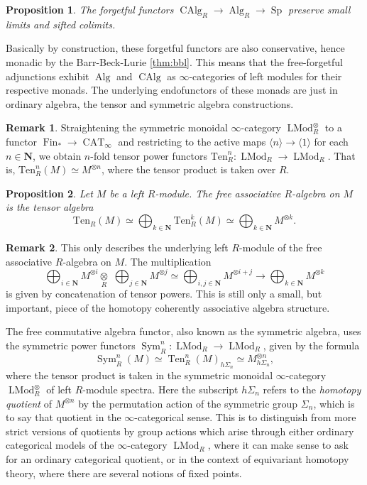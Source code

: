 \documentclass[12pt]{article}
\newtheorem{proposition}{Proposition}[subsection]
\theoremstyle{definition}
\newtheorem{remark}{Remark}[subsection]
\newcommand{\NN}{\mathbf{N}}
\renewcommand{\i}{\infty}
\newcommand{\too}{\longrightarrow}
\newcommand{\n}{\langle n\rangle}
\DeclareMathOperator{\LMod}{LMod}
\DeclareMathOperator{\Alg}{Alg}
\DeclareMathOperator{\CAlg}{CAlg}
\DeclareMathOperator{\CAT}{CAT}
\DeclareMathOperator{\Fin}{Fin}
\DeclareMathOperator{\Sym}{Sym}
\DeclareMathOperator{\Sp}{Sp}
\DeclareMathOperator{\Ten}{Ten}
\begin{document}
\begin{proposition}{\em \cite[Corollaries 3.2.2.4 and 3.2.3.2]{HA}}
The forgetful functors $\CAlg_R\to\Alg_R\to\Sp$ preserve small limits and sifted colimits.
\end{proposition}


Basically by construction, these forgetful functors are also conservative, hence monadic by the Barr-Beck-Lurie \autoref{thm:bbl}.
This means that the free-forgetful adjunctions exhibit $\Alg$ and $\CAlg$ as $\i$-categories of left modules for their respective monads.
The underlying endofunctors of these monads are just in ordinary algebra, the tensor and symmetric algebra constructions.
\begin{remark}
Straightening the symmetric monoidal $\infty$-category $\LMod_R^\otimes$ to a functor $\Fin_*\to\CAT_\i$ and restricting to the active maps $\n\to\langle 1\rangle$ for each $n\in\NN$, we obtain $n$-fold tensor power functors $\mathrm{Ten}_R^n:\LMod_R\to\LMod_R$.
That is, $\mathrm{Ten}_R^n(M)\simeq M^{\otimes n}$, where the tensor product is taken over $R$.
\end{remark}
\begin{proposition}{\em \cite[Proposition 4.1.1.18]{HA}}
Let $M$ be a left $R$-module.
The free associative $R$-algebra on $M$ is the tensor algebra
\[
\mathrm{Ten}_R(M)\simeq\bigoplus_{k\in\NN}\mathrm{Ten}^k_R(M)\simeq\bigoplus_{k\in\NN} M^{\otimes k}.
\]
\end{proposition}
\begin{remark}
This only describes the underlying left $R$-module of the free associative $R$-algebra on $M$.
The multiplication
\[
\bigoplus_{i\in\NN} M^{\otimes i}\underset{R}{\otimes}\,\,\bigoplus_{j\in\NN} M^{\otimes j}\simeq\bigoplus_{i,j\in\NN} M^{\otimes i+j}\too\bigoplus_{k\in\NN} M^{\otimes k}
\]
is given by concatenation of tensor powers.
This is still only a small, but important, piece of the homotopy coherently associative algebra structure. 
\end{remark}

The free commutative algebra functor, also known as the symmetric algebra, uses the symmetric power functors $\Sym^{n}_R:\LMod_R\to\LMod_R$,\index{$\Sym^n_R$} given by the formula
\[
\Sym^n_R(M)\simeq\Ten^n_R(M)_{h\Sigma_n}\simeq M^{\otimes n}_{h\Sigma_n},
\]
where the tensor product is taken in the symmetric monoidal $\infty$-category $\LMod_R^\otimes$ of left $R$-module spectra.
Here the subscript $h\Sigma_n$ refers to the {\em homotopy quotient} of $M^{\otimes n}$ by the permutation action of the symmetric group $\Sigma_n$, which is to say that quotient in the $\infty$-categorical sense.
This is to distinguish from more strict versions of quotients by group actions which arise through either ordinary categorical models of the $\infty$-category $\LMod_R$, where it can make sense to ask for an ordinary categorical quotient, or in the context of equivariant homotopy theory, where there are several notions of fixed points.
\end{document}

